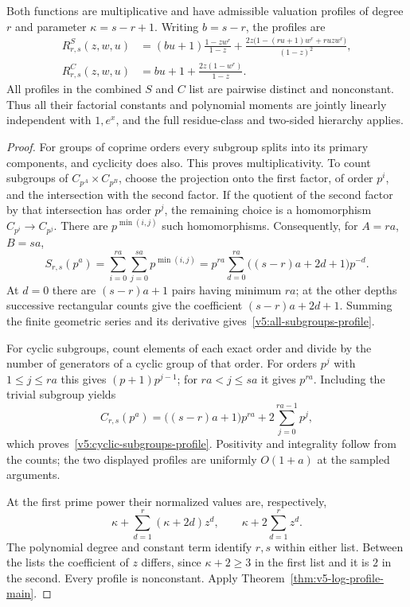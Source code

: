 \begin{proposition}\label{v5:rank-two-counts}
Both functions are multiplicative and have admissible valuation profiles
of degree $r$ and parameter $\kappa=s-r+1$.  Writing $b=s-r$, the profiles
are
\begin{align}
 R^S_{r,s}(z,w,u)
 &= (bu+1)\frac{1-zw^r}{1-z}
   +\frac{2z\bigl(1-(ru+1)w^r+ruzw^r\bigr)}{(1-z)^2},
       \label{v5:all-subgroups-profile}\\
 R^C_{r,s}(z,w,u)
 &=bu+1+\frac{2z(1-w^r)}{1-z}.
       \label{v5:cyclic-subgroups-profile}
\end{align}
All profiles in the combined $S$ and $C$ list are pairwise distinct
and nonconstant.  Thus all their factorial constants and polynomial
moments are jointly linearly independent with $1,e^x$, and the full
residue-class and two-sided hierarchy applies.
\end{proposition}
\begin{proof}
For groups of coprime orders every subgroup splits into its primary
components, and cyclicity does also.  This proves multiplicativity.
To count subgroups of $C_{p^A}\times C_{p^B}$, choose the projection
onto the first factor, of order $p^i$, and the intersection with the
second factor.  If the quotient of the second factor by that
intersection has order $p^j$, the remaining choice is a homomorphism
$C_{p^i}\longrightarrow C_{p^j}$.  There are $p^{\min(i,j)}$ such
homomorphisms.  Consequently, for $A=ra$, $B=sa$,
\[
 S_{r,s}(p^a)=\sum_{i=0}^{ra}\sum_{j=0}^{sa}p^{\min(i,j)}
   =p^{ra}\sum_{d=0}^{ra}\bigl((s-r)a+2d+1\bigr)p^{-d}.
\]
At $d=0$ there are $(s-r)a+1$ pairs having minimum $ra$; at the
other depths successive rectangular counts give the coefficient
$(s-r)a+2d+1$.  Summing the finite geometric series and its derivative
gives~\eqref{v5:all-subgroups-profile}.

For cyclic subgroups, count elements of each exact order and divide by
the number of generators of a cyclic group of that order.  For orders
$p^j$ with $1\leq j\leq ra$ this gives $(p+1)p^{j-1}$; for
$ra<j\leq sa$ it gives $p^{ra}$.  Including the trivial subgroup yields
\[
 C_{r,s}(p^a)=\bigl((s-r)a+1\bigr)p^{ra}
                   +2\sum_{j=0}^{ra-1}p^j,
\]
which proves~\eqref{v5:cyclic-subgroups-profile}.
Positivity and integrality follow from the counts; the two displayed
profiles are uniformly $O(1+a)$ at the sampled arguments.

At the first prime power their normalized values are, respectively,
\[
 \kappa+\sum_{d=1}^{r}(\kappa+2d)z^d,
 \qquad \kappa+2\sum_{d=1}^{r}z^d.
\]
The polynomial degree and constant term identify $r,s$ within either
list.  Between the lists the coefficient of $z$ differs, since
$\kappa+2\geq3$ in the first list and it is $2$ in the second.
Every profile is nonconstant.  Apply
Theorem~\ref{thm:v5-log-profile-main}.
\end{proof}

